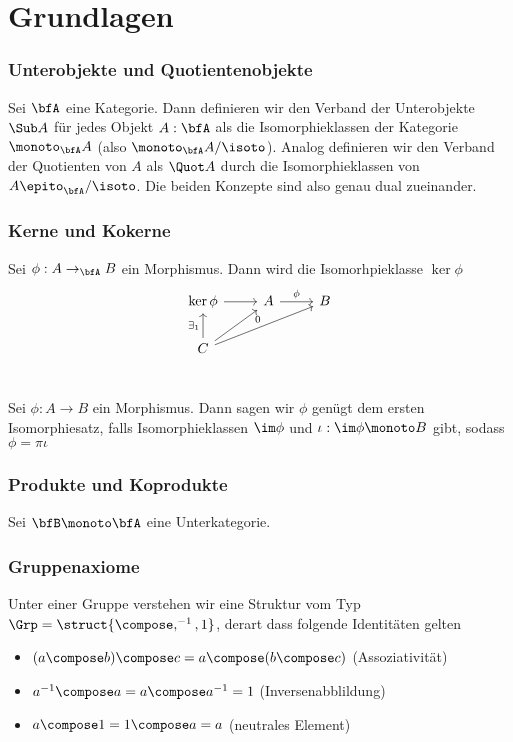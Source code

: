 \part{Grundlagen}

\section{Unterobjekte und Quotientenobjekte}

Sei $\bfA$ eine Kategorie. Dann definieren wir den Verband der Unterobjekte $\Sub A$ für jedes Objekt $A:\bfA$ als die
Isomorphieklassen der Kategorie $\monoto_\bfA A$ (also $\monoto_\bfA A/\isoto$).
Analog definieren wir den Verband der Quotienten von $A$ als $\Quot A$ durch die Isomorphieklassen von $A\epito_\bfA/\isoto$.
Die beiden Konzepte sind also genau dual zueinander.

\section{Kerne und Kokerne}

Sei $\phi:A\to_\bfA B$ ein Morphismus. Dann wird die Isomorhpieklasse $\ker \phi$
$$
\begin{tikzcd}
    \ker \phi \arrow{r} & A \arrow{r}{\phi} & B\\
    C \arrow{ur} \arrow{u}{\exists_1}\arrow{urr}{0} & & \\
\end{tikzcd}
$$

\begin{theorem}
    Sei $\phi:A\to B$ ein Morphismus. Dann sagen wir $\phi$ genügt dem ersten Isomorphiesatz, falls Isomorphieklassen $\im \phi$
    und $\iota : \im \phi \monoto B$
    gibt, sodass $\phi = \pi\iota$ 
\end{theorem}

\section{Produkte und Koprodukte}

Sei $\bfB\monoto\bfA$ eine Unterkategorie. 


\section{Gruppenaxiome}

Unter einer Gruppe verstehen wir eine Struktur vom Typ $\Grp=\struct{\compose,^{-1},1}$, derart dass folgende Identitäten gelten
\begin{itemize}
        \item $(a\compose b)\compose c = a\compose (b\compose c)$ (Assoziativität)
        \item $a^{-1}\compose a = a\compose a^{-1} = 1$ (Inversenabblildung)
    \item $a\compose 1 = 1\compose a = a$ (neutrales Element)
\end{itemize}

